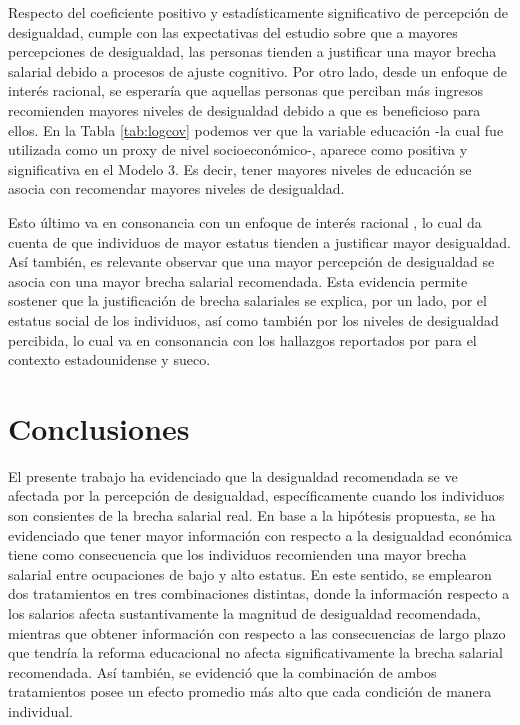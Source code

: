 \documentclass[12pt]{article}
\begin{document}
Respecto del coeficiente positivo y estadísticamente significativo de percepción de desigualdad, cumple con las expectativas del estudio sobre que a mayores percepciones de desigualdad, las personas tienden a justificar una mayor brecha salarial debido a procesos de ajuste cognitivo. Por otro lado, desde un enfoque de interés racional, se esperaría que aquellas personas que perciban más ingresos recomienden mayores niveles de desigualdad debido a que es beneficioso para ellos. En la Tabla \ref{tab:logcov} podemos ver que la variable educación -la cual fue utilizada como un proxy de nivel socioeconómico-, aparece como positiva y significativa en el Modelo 3. Es decir, tener mayores niveles de educación se asocia con recomendar mayores niveles de desigualdad. 

Esto último va en consonancia con un enfoque de interés racional \citep{Meltzer1981}, lo cual da cuenta de que individuos de mayor estatus tienden a justificar mayor desigualdad. Así también, es relevante observar que una mayor percepción de desigualdad se asocia con una mayor brecha salarial recomendada. Esta evidencia permite sostener que la justificación de brecha salariales se explica, por un lado, por el estatus social de los individuos, así como también por los niveles de desigualdad percibida, lo cual va en consonancia con los hallazgos reportados por \cite{Trump2017} para el contexto estadounidense y sueco.

\section*{Conclusiones}
 
El presente trabajo ha evidenciado que la desigualdad recomendada se ve afectada por la percepción de desigualdad, específicamente cuando los individuos son consientes de la brecha salarial real. En base a la hipótesis propuesta, se ha evidenciado que tener mayor información con respecto a la desigualdad económica tiene como consecuencia que los individuos recomienden una mayor brecha salarial entre ocupaciones de bajo y alto estatus. En este sentido, se emplearon dos tratamientos en tres combinaciones distintas, donde la información  respecto a los salarios afecta sustantivamente la magnitud de desigualdad recomendada, mientras que obtener información con respecto a las consecuencias de largo plazo que tendría la reforma educacional no afecta significativamente la brecha salarial recomendada. Así también, se evidenció que la combinación de ambos tratamientos posee un efecto promedio más alto que cada condición de manera individual. 
\end{document}
